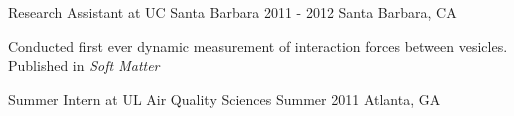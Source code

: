 \begin{cventries}
  \cventryshort
    {Research Assistant at UC Santa Barbara}
    {2011 - 2012}
    {Santa Barbara, CA}         
    {
      \begin{cvitems} 
        \item {Conducted first ever dynamic measurement of interaction forces between vesicles. Published in \emph{Soft Matter}}        
      \end{cvitems}
    }   
  
   \cventryshort
	{Summer Intern at UL Air Quality Sciences}    
    {Summer 2011}
    {Atlanta, GA}
    {}



\end{cventries}
